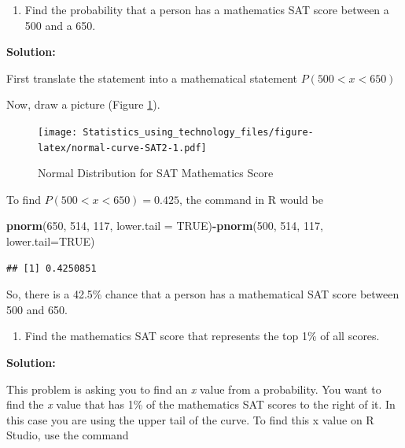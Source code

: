 \documentclass[
]{book}
\newenvironment{Shaded}{\begin{snugshade}}{\end{snugshade}}
\newcommand{\DataTypeTok}[1]{\textcolor[rgb]{0.13,0.29,0.53}{#1}}
\newcommand{\DecValTok}[1]{\textcolor[rgb]{0.00,0.00,0.81}{#1}}
\newcommand{\KeywordTok}[1]{\textcolor[rgb]{0.13,0.29,0.53}{\textbf{#1}}}
\newcommand{\NormalTok}[1]{#1}
\newcommand{\OperatorTok}[1]{\textcolor[rgb]{0.81,0.36,0.00}{\textbf{#1}}}
\newcommand{\OtherTok}[1]{\textcolor[rgb]{0.56,0.35,0.01}{#1}}
\providecommand{\tightlist}{%
  \setlength{\itemsep}{0pt}\setlength{\parskip}{0pt}}
\begin{document}
\begin{enumerate}
\def\labelenumi{\alph{enumi}.}
\setcounter{enumi}{3}
\tightlist
\item
  Find the probability that a person has a mathematics SAT score between a 500 and a 650.
\end{enumerate}

\textbf{Solution:}

First translate the statement into a mathematical statement \(P(500<x<650)\)

Now, draw a picture (Figure \ref{fig:normal-curve-SAT2}).



\begin{figure}
\centering
\texttt{[image: Statistics\_using\_technology\_files/figure-latex/normal-curve-SAT2-1.pdf]}
\caption{\label{fig:normal-curve-SAT2}Normal Distribution for SAT Mathematics Score}
\end{figure}

To find \(P(500<x<650)=0.425\), the command in R would be

\begin{Shaded}
\begin{Highlighting}[]
\KeywordTok{pnorm}\NormalTok{(}\DecValTok{650}\NormalTok{, }\DecValTok{514}\NormalTok{, }\DecValTok{117}\NormalTok{, }\DataTypeTok{lower.tail =} \OtherTok{TRUE}\NormalTok{)}\OperatorTok{-}\KeywordTok{pnorm}\NormalTok{(}\DecValTok{500}\NormalTok{, }\DecValTok{514}\NormalTok{, }\DecValTok{117}\NormalTok{, }\DataTypeTok{lower.tail=}\OtherTok{TRUE}\NormalTok{)}
\end{Highlighting}
\end{Shaded}

\begin{verbatim}
## [1] 0.4250851
\end{verbatim}

So, there is a 42.5\% chance that a person has a mathematical SAT score between 500 and 650.

\begin{enumerate}
\def\labelenumi{\alph{enumi}.}
\setcounter{enumi}{4}
\tightlist
\item
  Find the mathematics SAT score that represents the top 1\% of all scores.
\end{enumerate}

\textbf{Solution:}

This problem is asking you to find an \emph{x} value from a probability. You want to find the \emph{x} value that has 1\% of the mathematics SAT scores to the right of it. In this case you are using the upper tail of the curve.
To find this x value on R Studio, use the command
\end{document}
